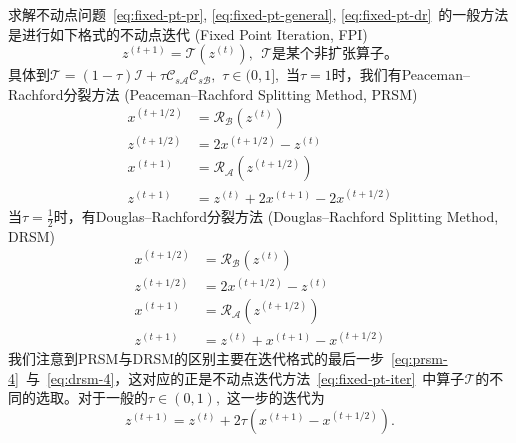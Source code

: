 求解不动点问题~\eqref{eq:fixed-pt-pr}, \eqref{eq:fixed-pt-general}, \eqref{eq:fixed-pt-dr}~的一般方法是进行如下格式的不动点迭代 (Fixed Point Iteration, FPI)
\begin{equation}
\label{eq:fixed-pt-iter}
z^{(t+1)} = \mathcal{T}(z^{(t)}), ~~ \text{$\mathcal{T}$是某个非扩张算子。}
\end{equation}
具体到$\mathcal{T} = (1 - \tau) \mathcal{I} + \tau \mathcal{C}_{s\mathcal{A}} \mathcal{C}_{s\mathcal{B}},$ $\tau \in (0, 1],$ 当$\tau = 1$时，我们有Peaceman–Rachford分裂方法 (Peaceman–Rachford Splitting Method, PRSM)
\begin{subequations}
\label{eq:prsm}
\begin{align}
x^{(t+1/2)} & = \mathcal{R}_{\mathcal{B}}(z^{(t)}) \label{eq:prsm-1} \\
z^{(t+1/2)} & = 2x^{(t+1/2)} - z^{(t)} \label{eq:prsm-2} \\
x^{(t+1)} & = \mathcal{R}_{\mathcal{A}}(z^{(t+1/2)}) \label{eq:prsm-3} \\
z^{(t+1)} & = z^{(t)} + 2x^{(t+1)} - 2x^{(t+1/2)} \label{eq:prsm-4}
\end{align}
\end{subequations}
当$\tau = \frac{1}{2}$时，有Douglas–Rachford分裂方法 (Douglas–Rachford Splitting Method, DRSM)
\begin{subequations}
\label{eq:drsm}
\begin{align}
x^{(t+1/2)} & = \mathcal{R}_{\mathcal{B}}(z^{(t)}) \label{eq:drsm-1} \\
z^{(t+1/2)} & = 2x^{(t+1/2)} - z^{(t)} \label{eq:drsm-2} \\
x^{(t+1)} & = \mathcal{R}_{\mathcal{A}}(z^{(t+1/2)}) \label{eq:drsm-3} \\
z^{(t+1)} & = z^{(t)} + x^{(t+1)} - x^{(t+1/2)} \label{eq:drsm-4}
\end{align}
\end{subequations}
我们注意到PRSM与DRSM的区别主要在迭代格式的最后一步~\eqref{eq:prsm-4}~与~\eqref{eq:drsm-4}，这对应的正是不动点迭代方法~\eqref{eq:fixed-pt-iter}~中算子$\mathcal{T}$的不同的选取。对于一般的$\tau \in (0, 1),$ 这一步的迭代为
\begin{equation}
\label{eq:sm-general-step}
z^{(t+1)} = z^{(t)} + 2\tau (x^{(t+1)} - x^{(t+1/2)}).
\end{equation}

